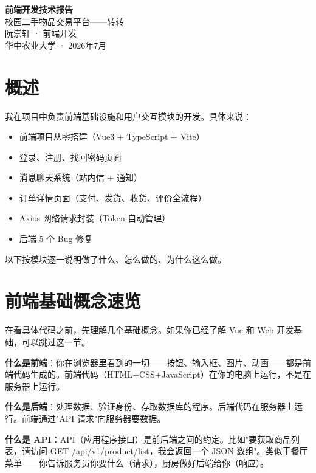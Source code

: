 \documentclass[12pt,a4paper]{ctexart}
\begin{document}
\begin{titlepage}
\centering\vspace*{3cm}
{\Huge\bfseries 前端开发技术报告}\\[0.5cm]
{\LARGE 校园二手物品交易平台——转转}\\[1.5cm]
{\Large 阮崇轩 · 前端开发}\\[0.3cm]
{\large 华中农业大学 · 2026年7月}
\end{titlepage}

\tableofcontents\newpage

\section{概述}

我在项目中负责前端基础设施和用户交互模块的开发。具体来说：
\begin{itemize}
  \item 前端项目从零搭建（Vue3 + TypeScript + Vite）
  \item 登录、注册、找回密码页面
  \item 消息聊天系统（站内信 + 通知）
  \item 订单详情页面（支付、发货、收货、评价全流程）
  \item Axios 网络请求封装（Token 自动管理）
  \item 后端 5 个 Bug 修复
\end{itemize}

以下按模块逐一说明做了什么、怎么做的、为什么这么做。

\section{前端基础概念速览}

在看具体代码之前，先理解几个基础概念。如果你已经了解 Vue 和 Web 开发基础，可以跳过这一节。

\textbf{什么是前端}：你在浏览器里看到的一切——按钮、输入框、图片、动画——都是前端代码生成的。前端代码（HTML+CSS+JavaScript）在你的电脑上运行，不是在服务器上运行。

\textbf{什么是后端}：处理数据、验证身份、存取数据库的程序。后端代码在服务器上运行。前端通过"API 请求"向服务器要数据。

\textbf{什么是 API}：API（应用程序接口）是前后端之间的约定。比如"要获取商品列表，请访问 GET /api/v1/product/list，我会返回一个 JSON 数组"。类似于餐厅菜单——你告诉服务员你要什么（请求），厨房做好后端给你（响应）。
\end{document}
